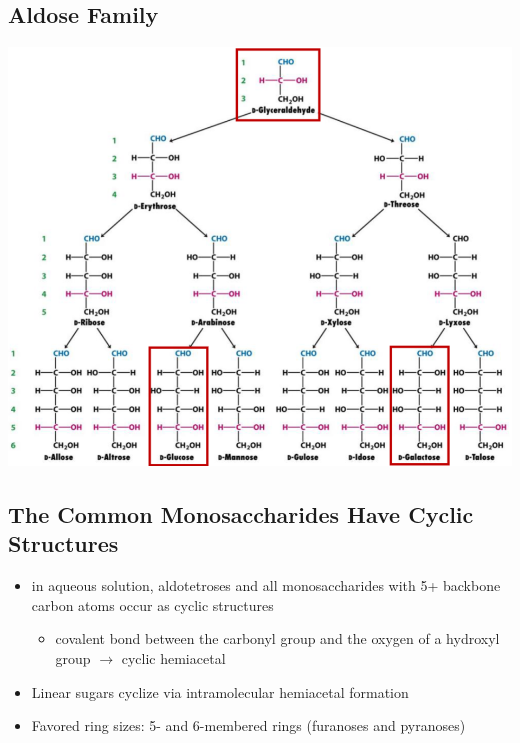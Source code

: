 \documentclass[10pt]{article}
\begin{document}
\subsection*{Aldose Family}
\begin{center}
    \includegraphics*[scale=0.6]{L1_6.png}
\end{center}

\subsection*{The Common Monosaccharides Have Cyclic Structures}
\begin{itemize}
    \item in aqueous solution, aldotetroses and all monosaccharides with 5+ backbone carbon atoms occur as cyclic structures
    \begin{itemize}
        \item covalent bond between the carbonyl group and the oxygen of a hydroxyl group $\rightarrow$ cyclic hemiacetal
    \end{itemize}
    \item Linear sugars cyclize via intramolecular hemiacetal formation
    \item Favored ring sizes: 5- and 6-membered rings (furanoses and pyranoses)
\end{itemize}
\end{document}
